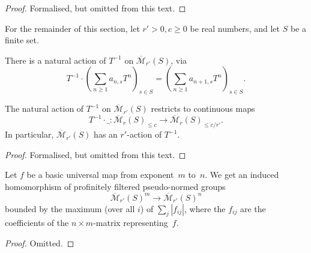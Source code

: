 \begin{proof}
  \leanok
  Formalised, but omitted from this text.
\end{proof}

For the remainder of this section,
let $r' > 0, c \ge 0$ be real numbers,
and let $S$ be a finite set.

\begin{definition}
  \label{Mbar_Tinv}
  \leanok
  There is a natural action of $T^{-1}$ on $\overline{\mathcal M}_{r'}(S)$, via
  \[
    T^{-1} \cdot
    \left( \sum_{n \ge 1} a_{n,s} T^n \right)_{s \in S} =
    \left( \sum_{n \ge 1} a_{n+1,s} T^n \right)_{s \in S}.
  \]
\end{definition}

\begin{lemma}
  \label{Mbar_with_Tinv}
  \leanok
  The natural action of $T^{-1}$ on $\overline{\mathcal M}_{r'}(S)$
  restricts to continuous maps
  \[
    T^{-1} \cdot \_ \colon
    \overline{\mathcal M}_r(S)_{\le c} \to
    \overline{\mathcal M}_r(S)_{\le c/r'}.
  \]
  In particular, $\overline{\mathcal M}_{r'}(S)$
  has an $r'$-action of $T^{-1}$.
\end{lemma}

\begin{proof}
  \leanok
  Formalised, but omitted from this text.
\end{proof}

\begin{lemma}
  \label{basic_eval_FP}
  \leanok
  Let $f$ be a basic universal map from exponent~$m$ to~$n$.
  We get an induced homomorphism of
  profinitely filtered pseudo-normed groups
  \[
    \overline{\mathcal M}_{r'}(S)^m \to \overline{\mathcal M}_{r'}(S)^n
  \]
  bounded by the maximum (over all $i$) of $\sum_j |f_{ij}|$,
  where the $f_{ij}$ are the coefficients of the $n \times m$-matrix representing~$f$.
\end{lemma}

\begin{proof}
  \leanok
  Omitted.
\end{proof}

